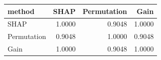 \begin{tabular}{lrrr}
\toprule
method & SHAP & Permutation & Gain \\
\midrule
SHAP & 1.0000 & 0.9048 & 1.0000 \\
Permutation & 0.9048 & 1.0000 & 0.9048 \\
Gain & 1.0000 & 0.9048 & 1.0000 \\
\bottomrule
\end{tabular}
